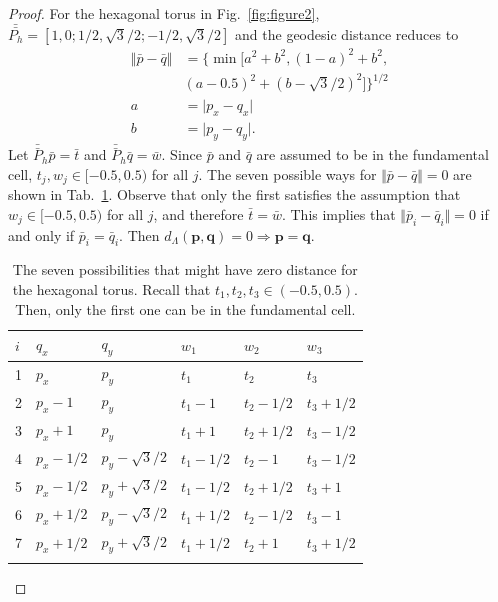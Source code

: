 \documentclass[default,iicol]{sn-jnl}%
\theoremstyle{thmstyleone}%
\theoremstyle{thmstyletwo}%
\theoremstyle{thmstylethree}%
\renewcommand{\vec}[1]{\bar{#1}}
\providecommand{\mat}[1]{\bar{\bar{#1}}}
\providecommand{\config}[1]{\mathbf{#1}}
\begin{document}
\begin{appendices}
\begin{proof}
		For the hexagonal torus in Fig.\ \ref{fig:figure2}, $\mat{P_h} = [1,0; 1/2, \sqrt{3}/2; -1/2, \sqrt{3}/2]$ and the geodesic distance reduces to
		\begin{align*}
			\Vert \vec{p} - \vec{q} \Vert &= \{\min[a^2 + b^2, (1 - a)^2 + b^2, \\
				&(a - 0.5)^2 + (b - \sqrt{3} / 2)^2] \}^{1 / 2} \nonumber \\
			a &= \lvert p_x - q_x \rvert \nonumber \\
			b &= \lvert p_y - q_y \rvert. 
		\end{align*}
		Let $\mat{P}_h \vec{p} = \vec{t}$ and $\mat{P}_h \vec{q} = \vec{w}$. Since $\vec{p}$ and $\vec{q}$ are assumed to be in the fundamental cell, $t_j, w_j \in [-0.5, 0.5)$ for all $j$. The seven possible ways for $\Vert \vec{p} - \vec{q} \Vert = 0$ are shown in Tab.\ \ref{table:distance_hexagon}. Observe that only the first satisfies the assumption that $w_j \in [-0.5, 0.5)$ for all $j$, and therefore $\vec{t} = \vec{w}$. This implies that $\Vert \vec{p}_i - \vec{q}_i \Vert = 0$ if and only if $\vec{p}_i = \vec{q}_i$. Then $d_\Lambda(\config{p}, \config{q}) = 0 \Longrightarrow \config{p} = \config{q}$.
		
		
	\begin{table}[h]
		\begin{center}
			\begin{minipage}{0.6\textwidth}
				\centering
				\caption{\label{table:distance_hexagon}The seven possibilities that might have zero distance for the hexagonal torus. Recall that $t_1, t_2, t_3 \in (-0.5,0.5)$. Then, only the first one can be in the fundamental cell.}
				\begin{tabular}{@{}llllll@{}}
					\toprule
					$i$  & $q_x$ & $q_y$ & $w_1$ & $w_2$ & $w_3$\\
					\midrule
					1	& $p_x$			& $p_y$ 			& $t_1$ 	& $t_2$			& $t_3$  	\\
					2	& $p_x-1$		& $p_y$ 			& $t_1-1$ 	& $t_2-1/2$		& $t_3+1/2$	\\
					3	& $p_x+1$		& $p_y$ 			& $t_1+1$ 	& $t_2+1/2$		& $t_3-1/2$	\\
					4	& $p_x-1/2$		& $p_y-\sqrt{3}/2$ 	& $t_1-1/2$ & $t_2-1$		& $t_3-1/2$	\\
					5	& $p_x-1/2$		& $p_y+\sqrt{3}/2$ 	& $t_1-1/2$ & $t_2+1/2$		& $t_3+1$	\\
					6	& $p_x+1/2$		& $p_y-\sqrt{3}/2$ 	& $t_1+1/2$ & $t_2-1/2$		& $t_3-1$	\\
					7	& $p_x+1/2$		& $p_y+\sqrt{3}/2$ 	& $t_1+1/2$ & $t_2+1$		& $t_3+1/2$	\\
					\botrule
				\end{tabular}
			\end{minipage}
		\end{center}
	\end{table}


\end{proof}
\end{appendices}
\end{document}
